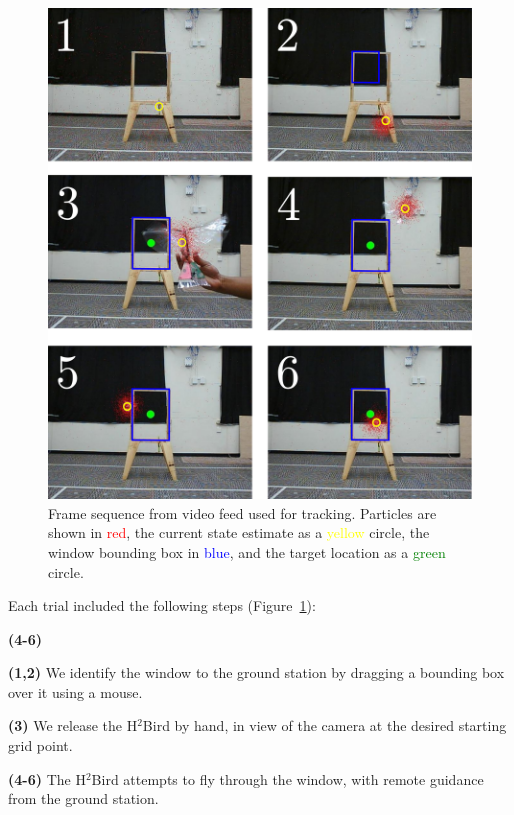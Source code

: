 \documentclass{aamas2013}
\newenvironment{spaced_description}[1]
  {\begin{list}{}%
   {\renewcommand\makelabel[1]{##1:\hfill}%
   \settowidth\labelwidth{\makelabel{#1}}%
   \setlength\leftmargin{\labelwidth}
   \addtolength\leftmargin{\labelsep}}}
  {\end{list}}
\begin{document}
\begin{figure}[tb]
\centering
\includegraphics[width=\linewidth]{figures/pf_screencap.pdf}
\caption{Frame sequence from video feed used for tracking. Particles 
are shown in \textcolor{red}{red}, the current state estimate as a 
\textcolor{yellow}{yellow} circle, the window bounding box in
\textcolor{blue}{blue}, and the target location as a \textcolor{green}{green} 
circle.}
\label{fig:pf_screencap}
\end{figure}

Each trial included the following steps (Figure~\ref{fig:pf_screencap}):
\begin{spaced_description}{\textbf{(4-6)}}
\item[\textbf{(1,2)}] We identify the window to the ground station by dragging a bounding 
box over it using a mouse. 
\item[\textbf{(3)}] We release the H$^2$Bird by hand, in view of the camera at the desired 
starting grid point.
\item[\textbf{(4-6)}] The H$^2$Bird attempts to fly through the window, with remote 
guidance from the ground station.
\end{spaced_description}
\end{document}
